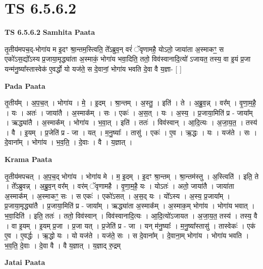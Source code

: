\documentclass[17pt]{extarticle}
\begin{document}
\section{ TS 6.5.6.2 }

\textbf{TS 6.5.6.2 } \newline
\textbf{Samhita Paata} \newline

तृ॒तीय॑मपच॒द्-भोगा॑य म इ॒दꣳ श्रा॒न्तम॒स्त्विति॒ ते᳚ऽब्रुव॒न् वरं॑ ॅवृणामहै॒ योऽतो॒ जाया॑ता अ॒स्माकꣳ॒॒ स एको॑ऽस॒द्यो᳚ऽस्य प्र॒जाया॒मृद्ध्या॑ता अ॒स्माकं॒ भोगा॑य भवा॒दिति॒ ततो॒ विव॑स्वानादि॒त्यो॑ ऽजायत॒ तस्य॒ वा इ॒यं प्र॒जा यन्म॑नु॒ष्या᳚स्तास्वेक॑ ए॒वर्द्धो यो यज॑ते॒ स दे॒वानां॒ भोगा॑य भवति दे॒वा वै य॒ज्ञा- [  ] \newline

\textbf{Pada Paata} \newline

तृ॒तीय᳚म् । अ॒प॒च॒त् । भोगा॑य । मे॒ । इ॒दम् । श्रा॒न्तम् । अ॒स्तु॒ । इति॑ । ते । अ॒ब्रु॒व॒न्न् । वर᳚म् । वृ॒णा॒म॒है॒ । यः । अतः॑ । जाया॑तै । अ॒स्माक᳚म् । सः । एकः॑ । अ॒स॒त् । यः । अ॒स्य॒ । प्र॒जाया॒मिति॑ प्र - जाया᳚म् । ऋद्ध्या॑तै । अ॒स्माक᳚म् । भोगा॑य । भ॒वा॒त् । इति॑ । ततः॑ । विव॑स्वान् । आ॒दि॒त्यः । अ॒जा॒य॒त॒ । तस्य॑ । वै । इ॒यम् । प्र॒जेति॑ प्र - जा । यत् । म॒नु॒ष्याः᳚ । तासु॑ । एकः॑ । ए॒व । ऋ॒द्धः । यः । यज॑ते । सः । दे॒वाना᳚म् । भोगा॑य । भ॒व॒ति॒ । दे॒वाः । वै । य॒ज्ञात् ।  \newline


\textbf{Krama Paata} \newline

तृ॒तीय॑मपचत् । अ॒प॒च॒द् भोगा॑य । भोगा॑य मे । म॒ इ॒दम् । इ॒दꣳ श्रा॒न्तम् । श्रा॒न्तम॑स्तु । अ॒स्त्विति॑ । इति॒ ते । ते᳚ऽब्रुवन्न् । अ॒ब्रु॒व॒न् वर᳚म् । वर॑म् ॅवृणामहै । वृ॒णा॒म॒है॒ यः । योऽतः॑ । अतो॒ जाया॑तै । जाया॑ता अ॒स्माक᳚म् । अ॒स्माकꣳ॒॒ सः । स एकः॑ । एको॑ऽसत् । अ॒स॒द् यः । यो᳚ऽस्य । अ॒स्य॒ प्र॒जाया᳚म् । प्र॒जाया॒मृद्ध्या॑तै । प्र॒जाया॒मिति॑ प्र - जाया᳚म् । ऋद्ध्या॑ता अ॒स्माक᳚म् । अ॒स्माक॒म् भोगा॑य । भोगा॑य भवात् । भ॒वा॒दिति॑ । इति॒ ततः॑ । ततो॒ विव॑स्वान् । विव॑स्वानादि॒त्यः । आ॒दि॒त्यो॑ऽजायत । अ॒जा॒य॒त॒ तस्य॑ । तस्य॒ वै । वा इ॒यम् । इ॒यम् प्र॒जा । प्र॒जा यत् । प्र॒जेति॑ प्र - जा । यन् म॑नु॒ष्याः᳚ । म॒नु॒ष्या᳚स्तासु॑ । तास्वेकः॑ । एक॑ ए॒व । ए॒वर्द्धः । ऋ॒द्धो यः । यो यज॑ते । यज॑ते॒ सः । स दे॒वाना᳚म् । दे॒वाना॒म् भोगा॑य । भोगा॑य भवति । भ॒व॒ति॒ दे॒वाः । दे॒वा वै । वै य॒ज्ञात् । य॒ज्ञाद् रु॒द्रम् \newline

\textbf{Jatai Paata} \newline
\end{document}
